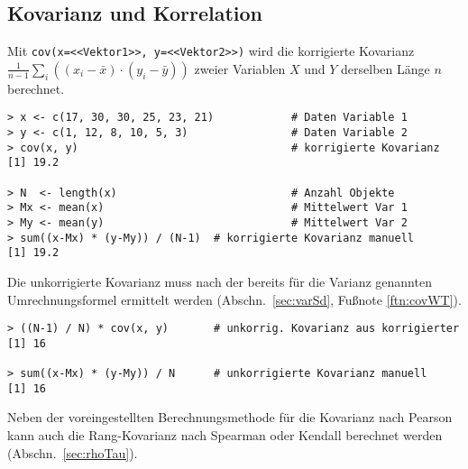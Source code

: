 \subsection{Kovarianz und Korrelation}
\label{sec:covCor}

Mit \lstinline!cov(x=<<Vektor1>>, y=<<Vektor2>>)! wird die korrigierte Kovarianz $\frac{1}{n-1} \sum_{i} \left((x_{i}-\bar{x}) \cdot (y_{i}-\bar{y})\right)$ zweier Variablen $X$ und $Y$ derselben Länge $n$ berechnet.
\begin{lstlisting}
> x <- c(17, 30, 30, 25, 23, 21)            # Daten Variable 1
> y <- c(1, 12, 8, 10, 5, 3)                # Daten Variable 2
> cov(x, y)                                 # korrigierte Kovarianz
[1] 19.2

> N  <- length(x)                           # Anzahl Objekte
> Mx <- mean(x)                             # Mittelwert Var 1
> My <- mean(y)                             # Mittelwert Var 2
> sum((x-Mx) * (y-My)) / (N-1)  # korrigierte Kovarianz manuell
[1] 19.2
\end{lstlisting}

Die unkorrigierte Kovarianz muss nach der bereits für die Varianz genannten Umrechnungsformel ermittelt werden (Abschn.\ \ref{sec:varSd}, Fußnote \ref{ftn:covWT}).
\begin{lstlisting}
> ((N-1) / N) * cov(x, y)       # unkorrig. Kovarianz aus korrigierter
[1] 16

> sum((x-Mx) * (y-My)) / N      # unkorrigierte Kovarianz manuell
[1] 16
\end{lstlisting}

Neben der voreingestellten Berechnungsmethode für die Kovarianz nach Pearson kann auch die Rang-Kovarianz nach Spearman oder Kendall berechnet werden (Abschn.\ \ref{sec:rhoTau}).

